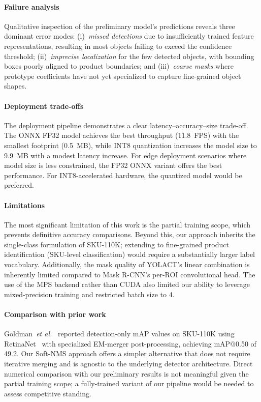 \documentclass[conference]{IEEEtran}
\newcommand{\etal}{\emph{et al.}}
\begin{document}
\paragraph{Failure analysis}
Qualitative inspection of the preliminary model's predictions reveals
three dominant error modes: (i)~\emph{missed detections} due to
insufficiently trained feature representations, resulting in most
objects failing to exceed the confidence threshold;
(ii)~\emph{imprecise localization} for the few detected objects, with
bounding boxes poorly aligned to product boundaries; and
(iii)~\emph{coarse masks} where prototype coefficients have not yet
specialized to capture fine-grained object shapes.

\paragraph{Deployment trade-offs}
The deployment pipeline demonstrates a clear latency--accuracy--size
trade-off. The ONNX FP32 model achieves the best throughput (11.8~FPS)
with the smallest footprint (0.5~MB), while INT8 quantization increases
the model size to 9.9~MB with a modest latency increase. For edge
deployment scenarios where model size is less constrained, the FP32 ONNX
variant offers the best performance. For INT8-accelerated hardware, the
quantized model would be preferred.

\paragraph{Limitations}
The most significant limitation of this work is the partial training
scope, which prevents definitive accuracy comparisons. Beyond this,
our approach inherits the single-class formulation of SKU-110K;
extending to fine-grained product identification (SKU-level
classification) would require a substantially larger label vocabulary.
Additionally, the mask quality of YOLACT's linear combination is
inherently limited compared to Mask R-CNN's per-ROI convolutional head.
The use of the MPS backend rather than CUDA also limited our ability to
leverage mixed-precision training and restricted batch size to 4.

\paragraph{Comparison with prior work}
Goldman~\etal~\cite{goldman2019dense} reported detection-only mAP values
on SKU-110K using RetinaNet~\cite{lin2017focal} with specialized
EM-merger post-processing, achieving mAP@0.50 of 49.2. Our Soft-NMS
approach offers a simpler alternative that does not require iterative
merging and is agnostic to the underlying detector architecture. Direct
numerical comparison with our preliminary results is not meaningful
given the partial training scope; a fully-trained variant of our pipeline
would be needed to assess competitive standing.
\end{document}

